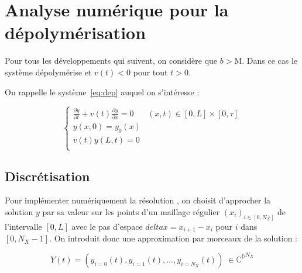 \documentclass[a4paper]{article}
\newcommand{\mass}{\mathrm{M}}
\newcommand{\dep}{b}
\begin{document}
\section{Analyse numérique pour la dépolymérisation}

Pour tous les développements qui suivent, on considère que $\dep>\mass$. Dans ce cas le système dépolymérise et $v(t)<0$ pour tout $t>0$.

On rappelle le système~\eqref{eq:dep} auquel on s'intéresse :

\[
\begin{cases}
		\displaystyle \frac{\partial y}{\partial t}+ v(t) \frac{\partial y} {\partial x}  = 0 & (x,t) \in [0,L] \times [0, \tau] \\
        y(x,0) = y_{0} (x) \\
	    v(t)y(L,t) = 0 \\
\end{cases}
\]

\subsection{Discrétisation}

Pour implémenter numériquement la résolution , on choisit d'approcher la solution $y$ par sa valeur sur les points d'un maillage régulier $(x_i)_{i \in [0,N_X]}$ de l'intervalle $[0,L]$ avec le pas d'espace $ delta x = x_{i+1} - x_i$ pour $i$ dans $[0,N_X-1]$. On introduit donc une approximation par morceaux de la solution :

\[ Y(t) = (y_{i=0}(t), y_{i=1}(t),...,y_{i=N_X}(t)) \; \in \mathbb{C^0}^{N_X}\]
\end{document}
